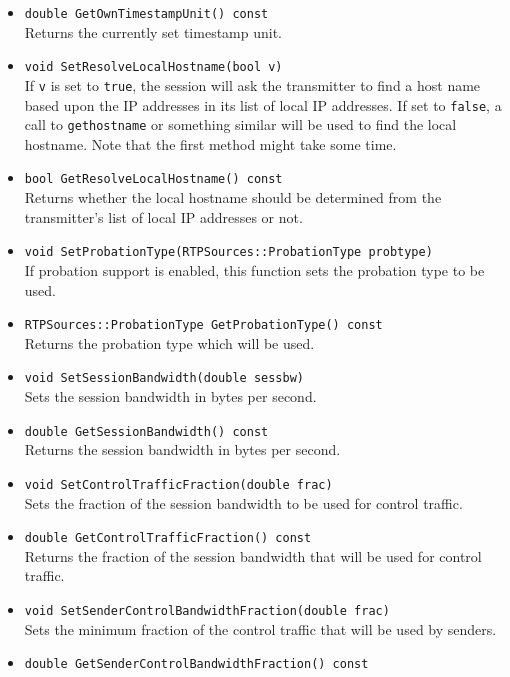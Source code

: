 \documentclass[12pt,a4paper]{article}
\begin{document}
\begin{itemize}
					\item {\tt double GetOwnTimestampUnit() const}\\
						Returns the currently set timestamp unit.
					\item {\tt void SetResolveLocalHostname(bool v)}\\
						If {\tt v} is set to {\tt true}, the session will ask
						the transmitter to find a host name based upon the IP
						addresses in its list of local IP addresses. If set to
						{\tt false}, a call to {\tt gethostname} or something
						similar will be used to find the local hostname. Note
						that the first method might take some time.
					\item {\tt bool GetResolveLocalHostname() const}\\
						Returns whether the local hostname should be determined
						from the transmitter's list of local IP addresses or not.
					\item {\tt void SetProbationType(RTPSources::ProbationType probtype)}\\
						If probation support is enabled, this function sets the
						probation type to be used.
					\item {\tt RTPSources::ProbationType GetProbationType() const}\\
						Returns the probation type which will be used.
					\item {\tt void SetSessionBandwidth(double sessbw)}\\
						Sets the session bandwidth in bytes per second.
					\item {\tt double GetSessionBandwidth() const}\\
						Returns the session bandwidth in bytes per second.
					\item {\tt void SetControlTrafficFraction(double frac)}\\
						Sets the fraction of the session bandwidth to be used
						for control traffic.
					\item {\tt double GetControlTrafficFraction() const}\\
						Returns the fraction of the session bandwidth that will
						be used for control traffic.
					\item {\tt void SetSenderControlBandwidthFraction(double frac)}\\
						Sets the minimum fraction of the control traffic that
						will be used by senders.
					\item {\tt double GetSenderControlBandwidthFraction() const}\\

\end{itemize}
\end{document}
